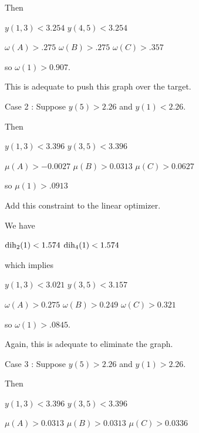 Then 

$y(1,3)<3.254$ \newline
$y(4,5)<3.254$ \newline

$\omega(A)>.275$ \newline
$\omega(B)>.275$ \newline
$\omega(C)>.357$ \newline

so $\omega(1)>0.907$.  

This is adequate to push this graph over the target.


Case 2 : Suppose $y(5)>2.26$ and $y(1)<2.26.$


Then

$y(1,3)<3.396$ \newline
$y(3,5)<3.396$ \newline

$\mu(A)>-0.0027$ \newline
$\mu(B)>0.0313$ \newline
$\mu(C)>0.0627$ \newline

so $\mu(1)>.0913$

Add this constraint to the linear optimizer.

We have

$\operatorname{dih}_2(1)<1.574$ \newline
$\operatorname{dih}_4(1)<1.574$ \newline

which implies

$y(1,3)<3.021$ \newline
$y(3,5)<3.157$ \newline

$\omega(A)>0.275$ \newline
$\omega(B)>0.249$ \newline
$\omega(C)>0.321$ \newline

so $\omega(1)>.0845.$

Again, this is adequate to eliminate the graph.

Case 3 : Suppose $y(5)>2.26$ and $y(1)>2.26.$


Then

$y(1,3)<3.396$ \newline
$y(3,5)<3.396$ \newline

$\mu(A)>0.0313$ \newline
$\mu(B)>0.0313$ \newline
$\mu(C)>0.0336$ \newline

